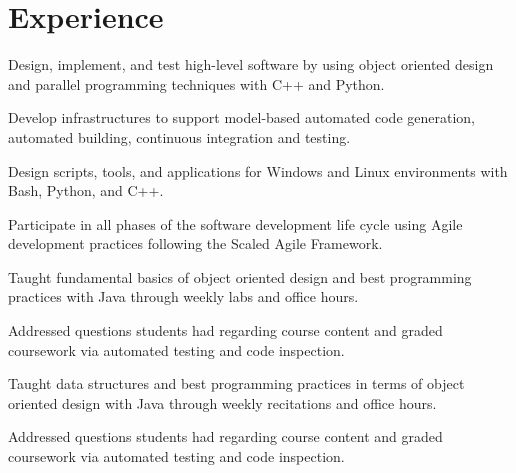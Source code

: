 \documentclass{jake-resume}
\begin{document}
\begin{minipage}[t]{0.66\textwidth} 




\section{Experience}
\vspace{\topsep}
\vspace{\topsep}
\begin{tightemize}
\item Design, implement, and test high-level software by using object oriented design and parallel programming techniques with C++ and Python. \vspace{10pt}
\item Develop infrastructures to support model-based automated code generation, automated building, continuous integration and testing. \vspace{10pt}
\item Design scripts, tools, and applications for Windows and Linux environments with Bash, Python, and C++. \vspace{10pt}
\item Participate in all phases of the software development life cycle using Agile development practices following the Scaled Agile Framework.
\end{tightemize}
\sectionsep

\vspace{\topsep}
\begin{tightemize}
\item Taught fundamental basics of object oriented design and best programming practices with Java through weekly labs and office hours. \vspace{10pt}
\item Addressed questions students had regarding course content and graded coursework via automated testing and code inspection. \vspace{10pt} 
\end{tightemize}
\sectionsep

\vspace{\topsep}
\begin{tightemize}
\item Taught data structures and best programming practices in terms of object oriented design with Java through weekly recitations and office hours. \vspace{10pt}
\item Addressed questions students had regarding course content and graded coursework via automated testing and code inspection. \vspace{10pt}
\end{tightemize}
\sectionsep


\end{minipage}
\end{document}
